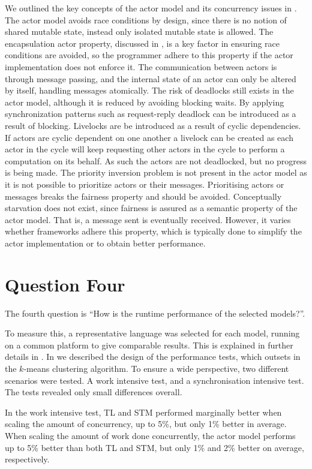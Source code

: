 We outlined the key concepts of the actor model and its concurrency issues in . The actor model avoids race conditions by design, since there is no notion of shared mutable state, instead only isolated mutable state is allowed. The encapsulation actor property, discussed in , is a key factor in ensuring race conditions are avoided, so the programmer adhere to this property if the actor implementation does not enforce it. The communication between actors is through message passing, and the internal state of an actor can only be altered by itself, handling messages atomically. The risk of deadlocks still exists in the actor model, although it is reduced by avoiding blocking waits. By applying synchronization patterns such as request-reply deadlock can be introduced as a result of blocking. Livelocks are be introduced as a result of cyclic dependencies. If actors are cyclic dependent on one another a livelock can be created as each actor in the cycle will keep requesting other actors in the cycle to perform a computation on its behalf. As such the actors are not deadlocked, but no progress is being made. The priority inversion problem is not present in the actor model as it is not possible to prioritize actors or their messages. Prioritising actors or messages breaks the fairness property and should be avoided. Conceptually starvation does not exist, since fairness is assured as a semantic property of the actor model. That is, a message sent is eventually received. However, it varies whether frameworks adhere this property, which is typically done to simplify the actor implementation or to obtain better performance.
\section{Question Four}
The fourth question is ``How is the runtime performance of the selected models?''.

To measure this, a representative language was selected for each model, running on a common platform to give comparable results. This is explained in further details in . In  we described the design of the performance tests, which outsets in the $k$-means clustering algorithm. To ensure a wide perspective, two different scenarios were tested. A work intensive test, and a synchronisation intensive test. The tests revealed only small differences overall. 

In the work intensive test, \ac{TL} and \ac{STM} performed marginally better when scaling the amount of concurrency, up to 5\%, but only 1\% better in average. When scaling the amount of work done concurrently, the actor model performs up to 5\% better than both \ac{TL} and \ac{STM}, but only 1\% and 2\% better on average, respectively.

